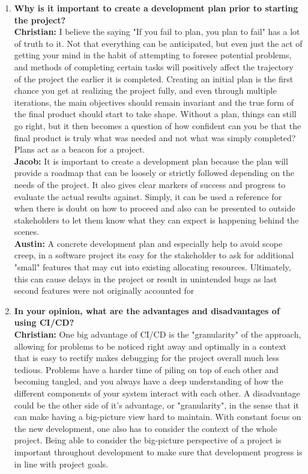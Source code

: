 \documentclass{article}
\begin{document}
\begin{enumerate}
    \item \textbf{Why is it important to create a development plan prior to starting the
    project?}\\
  
  \textbf{Christian:} I believe the saying "If you fail to plan, you plan to fail" has a lot of truth to it. Not that everything can be anticipated, but even just the act of getting your mind in the habit of attempting to foresee potential problems, and methods of completing certain tasks will positively affect the trajectory of the project the earlier it is completed. Creating an initial plan is the first chance you get at realizing the project fully, and even through multiple iterations, the main objectives should remain invariant and the true form of the final product should start to take shape. Without a plan, things can still go right, but it then becomes a question of how confident can you be that the final product is truly what was needed and not what was simply completed? Plans act as a beacon for a project.\\

  \textbf{Jacob:} It is important to create a development plan because the plan will provide a roadmap that can be loosely or strictly followed depending on the needs of the project. It also gives clear markers of success and progress to evaluate the actual results against. Simply, it can be used a reference for when there is doubt on how to proceed and also can be presented to outside stakeholders to let them know what they can expect is happening behind the scenes.\\

  \textbf{Austin:} A concrete development plan and especially help to avoid scope creep, in a software project its easy for the stakeholder to ask for additional "small" features that may cut into existing allocating resources. Ultimately, this can cause delays in the project or result in unintended bugs as last second features were not originally accounted for\\

  \item \textbf{In your opinion, what are the advantages and disadvantages of using CI/CD?}\\

  \textbf{Christian:} One big advantage of CI/CD is the "granularity" of the approach, allowing for problems to be noticed right away and optimally in a context that is easy to rectify makes debugging for the project overall much less tedious. Problems have a harder time of piling on top of each other and becoming tangled, and you always have a deep understanding of how the different components of your system interact with each other. A disadvantage could be the other side of it's advantage, or "granularity", in the sense that it can make having a big-picture view hard to maintain. With constant focus on the new development, one also has to consider the context of the whole project. Being able to consider the big-picture perspective of a project is important throughout development to make sure that development progress is in line with project goals.\\


\end{enumerate}
\end{document}
